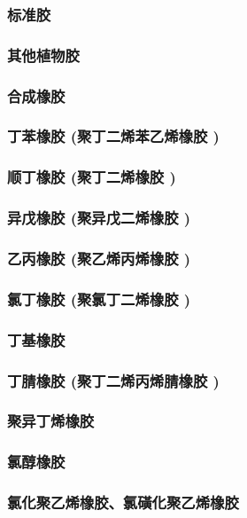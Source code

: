 \documentclass[UTF8]{../../ApplicationUniverse}
\begin{document}
    \subsubsection{标准胶}
    \subsubsection{其他植物胶}
\subsubsection{合成橡胶}
    \subsubsection{丁苯橡胶 (聚丁二烯苯乙烯橡胶 )}
    \subsubsection{顺丁橡胶 (聚丁二烯橡胶 )}
    \subsubsection{异戊橡胶 (聚异戊二烯橡胶 )}
    \subsubsection{乙丙橡胶 (聚乙烯丙烯橡胶 )}
    \subsubsection{氯丁橡胶 (聚氯丁二烯橡胶 )}
    \subsubsection{丁基橡胶}
    \subsubsection{丁腈橡胶 (聚丁二烯丙烯腈橡胶 )}
    \subsubsection{聚异丁烯橡胶}
        \subsubsection{氯醇橡胶}
        \subsubsection{氯化聚乙烯橡胶、氯磺化聚乙烯橡胶}
\end{document}
